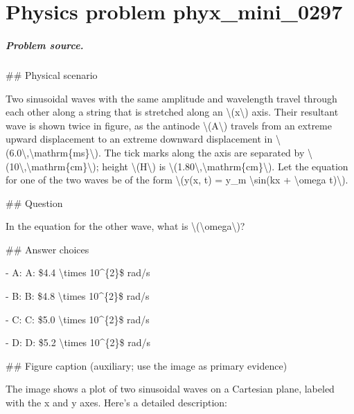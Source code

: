 
\chapter{Physics problem phyx\_mini\_0297}
\label{ch:PhyXMiniProblems_problem_phyx_mini_0297}

\paragraph{Problem source.}
\#\# Physical scenario

Two sinusoidal waves with the same amplitude and wavelength travel through each other along a string that is stretched along an \textbackslash{}(x\textbackslash{}) axis. Their resultant wave is shown twice in figure, as the antinode \textbackslash{}(A\textbackslash{}) travels from an extreme upward displacement to an extreme downward displacement in \textbackslash{}(6.0\textbackslash{},\textbackslash{}mathrm\{ms\}\textbackslash{}). The tick marks along the axis are separated by \textbackslash{}(10\textbackslash{},\textbackslash{}mathrm\{cm\}\textbackslash{}); height \textbackslash{}(H\textbackslash{}) is \textbackslash{}(1.80\textbackslash{},\textbackslash{}mathrm\{cm\}\textbackslash{}). Let the equation for one of the two waves be of the form \textbackslash{}(y(x, t) = y\_m \textbackslash{}sin(kx + \textbackslash{}omega t)\textbackslash{}).

\#\# Question

In the equation for the other wave, what is \textbackslash{}(\textbackslash{}omega\textbackslash{})?

\#\# Answer choices

- A: A: \$4.4 \textbackslash{}times 10\textasciicircum{}\{2\}\$ rad/s

- B: B: \$4.8 \textbackslash{}times 10\textasciicircum{}\{2\}\$ rad/s

- C: C: \$5.0 \textbackslash{}times 10\textasciicircum{}\{2\}\$ rad/s

- D: D: \$5.2 \textbackslash{}times 10\textasciicircum{}\{2\}\$ rad/s

\#\# Figure caption (auxiliary; use the image as primary evidence)

The image shows a plot of two sinusoidal waves on a Cartesian plane, labeled with the x and y axes. Here's a detailed description:

